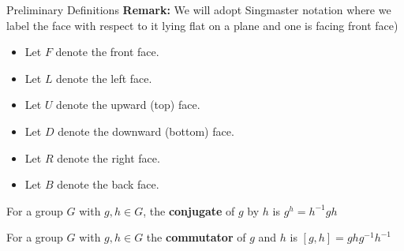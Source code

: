 \documentclass[final]{beamer}
\newlength{\colwidth}
\begin{document}
\begin{frame}[t]
\begin{columns}[t]
\begin{column}{\colwidth}
\begin{alertblock}{Preliminary Definitions}
\textbf{Remark:}
We will adopt Singmaster notation where
we label the face with respect to it lying
flat on a plane and one is facing front face)

\begin{itemize}
\item Let $F$ denote the front face.
\item Let $L$ denote the left face.
\item Let $U$ denote the upward (top) face.
\item Let $D$ denote the downward (bottom) face.
\item Let $R$ denote the right face.
\item Let $B$ denote the back face.
\end{itemize}

For a group $G$ with $g,h \in G$, the \textbf{conjugate} of $g$ by $h$ is
$g^h = h^{-1}gh$

For a group $G$ with $g,h \in G$
the \textbf{commutator} of $g$ and $h$ is
$[g,h]=ghg^{-1}h^{-1}$







\end{alertblock}
\end{column}
\end{columns}
\end{frame}
\end{document}

